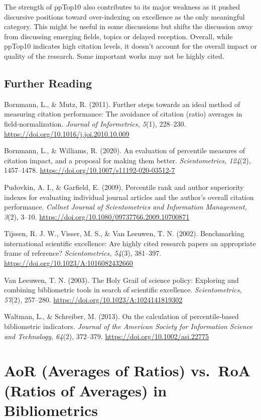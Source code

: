 \documentclass[
  letterpaper,
]{scrreprt}
\begin{document}
The strength of ppTop10 also contributes to its major weakness as it
pushed discursive positions toward over-indexing on excellence as the
only meaningful category. This might be useful in some discussions but
shifts the discussion away from discussing emerging fields, topics or
delayed reception. Overall, while ppTop10 indicates high citation
levels, it doesn't account for the overall impact or quality of the
research. Some important works may not be highly cited.

\section{Further Reading}\label{further-reading-9}

Bornmann, L., \& Mutz, R. (2011). Further steps towards an ideal method
of measuring citation performance: The avoidance of citation (ratio)
averages in field-normalization. \emph{Journal of Informetrics, 5}(1),
228--230. \url{https://doi.org/10.1016/j.joi.2010.10.009}

Bornmann, L., \& Williams, R. (2020). An evaluation of percentile
measures of citation impact, and a proposal for making them better.
\emph{Scientometrics, 124}(2), 1457--1478.
\url{https://doi.org/10.1007/s11192-020-03512-7}

Pudovkin, A. I., \& Garfield, E. (2009). Percentile rank and author
superiority indexes for evaluating individual journal articles and the
author's overall citation performance. \emph{Collnet Journal of
Scientometrics and Information Management, 3}(2), 3--10.
\url{https://doi.org/10.1080/09737766.2009.10700871}

Tijssen, R. J. W., Visser, M. S., \& Van Leeuwen, T. N. (2002).
Benchmarking international scientific excellence: Are highly cited
research papers an appropriate frame of reference? \emph{Scientometrics,
54}(3), 381--397. \url{https://doi.org/10.1023/A:1016082432660}

Van Leeuwen, T. N. (2003). The Holy Grail of science policy: Exploring
and combining bibliometric tools in search of scientific excellence.
\emph{Scientometrics, 57}(2), 257--280.
\url{https://doi.org/10.1023/A:1024141819302}

Waltman, L., \& Schreiber, M. (2013). On the calculation of
percentile‐based bibliometric indicators. \emph{Journal of the American
Society for Information Science and Technology, 64}(2), 372--379.
\url{https://doi.org/10.1002/asi.22775}

\chapter{AoR (Averages of Ratios) vs.~RoA (Ratios of Averages) in
Bibliometrics}\label{aor-averages-of-ratios-vs.-roa-ratios-of-averages-in-bibliometrics}
\end{document}
